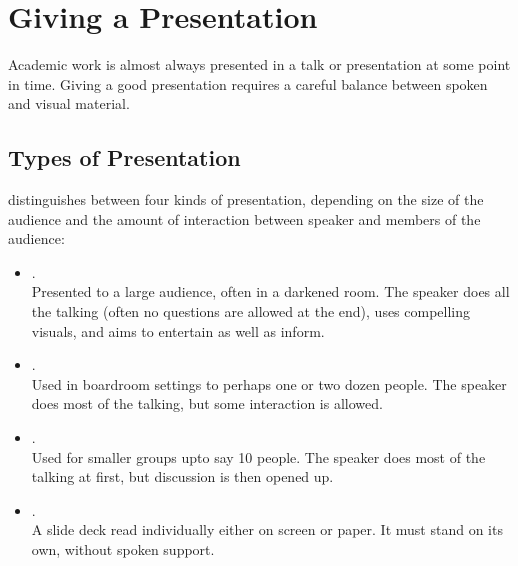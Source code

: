 %
%
% 
% 
% 


\chapter{Giving a Presentation}

\label{chap:Presentation}




Academic work is almost always presented in a talk or presentation at
some point in time. Giving a good presentation requires a careful
balance between spoken and visual material.


\section{Types of Presentation}

\textcite{SpeakingPowerPoint} distinguishes between four kinds of
presentation, depending on the size of the audience and the amount of
interaction between speaker and members of the audience:
\begin{itemize}
\item {}. \\
   Presented to a large audience,
  often in a darkened room. The speaker does all the talking (often no
  questions are allowed at the end), uses compelling visuals, and aims
  to entertain as well as inform.

\item {}. \\
   Used in boardroom settings to
  perhaps one or two dozen people. The speaker does most of the
  talking, but some interaction is allowed.

\item {}. \\
  Used for smaller groups upto
  say 10 people. The speaker does most of the talking at first, but
  discussion is then opened up.

\item {}. \\
  A slide deck read individually
  either on screen or paper. It must stand on its own, without spoken
  support.
\end{itemize}






